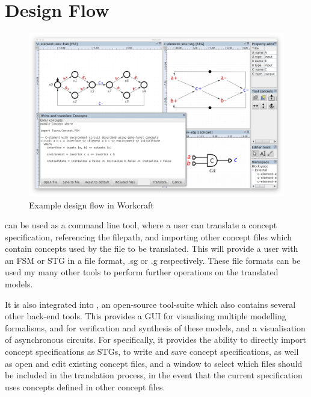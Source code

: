 
\section {Design Flow \label{sec:design-flow}} 

\begin{figure}[H]
	\begin{centering}
		\includegraphics[scale=0.25]{images/workcraft-screenshot}
		\par\end{centering}
	\protect\caption{\label{fig:workcraft-screenshot} Example design flow in Workcraft}
\end{figure}

 can be used as a command line tool, where a user can translate a concept specification, 
referencing the filepath, and importing other concept files which contain concepts used by the file to be 
translated. This will provide a user with an FSM or STG in a file format, .sg or .g respectively. These file 
formats can be used my many other tools to perform further operations on the translated models. 
 
It is also integrated into , an open-source tool-suite which also contains
several other back-end tools. This provides a GUI for visualising multiple modelling formalisms,
and for verification and synthesis of these models, and a visualisation of asynchronous circuits. For 
 specifically, it provides the ability to directly import concept specifications as STGs, to 
write and save concept specifications, as well as open and edit existing concept files, and a window to 
select which files should be included in the translation process, in the event that the current 
specification uses concepts defined in other concept files. 

